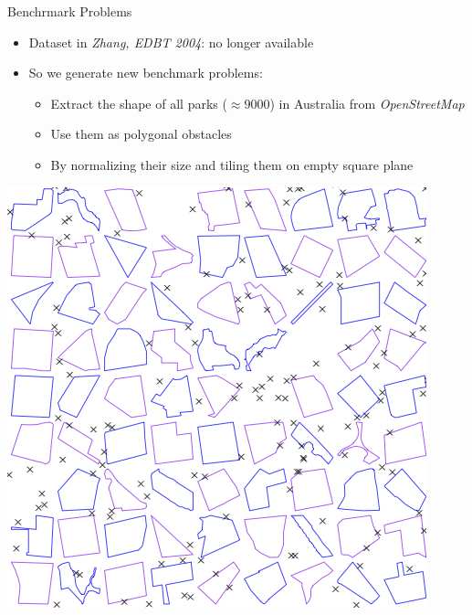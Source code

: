 \begin{frame}{Benchrmark Problems}
\begin{minipage}{.6\textwidth}
\begin{itemize}
    \item \small{Dataset in \textit{Zhang, EDBT 2004}: no longer available}
    \item \small{So we generate new benchmark problems:}
    \begin{itemize}
        \item \small{Extract the shape of all parks ($\approx 9000$) in Australia from \textit{OpenStreetMap}}
        \item \small{Use them as polygonal obstacles}
        \item \small{By normalizing their size and tiling them on empty square plane}
    \end{itemize}
\end{itemize}
\end{minipage}%
\begin{minipage}{.4\textwidth}
    \begin{adjustbox}{max totalsize={.9\textwidth}{.9\textheight}, right}
    \centering
    \includegraphics{pic/distribution.png}
    \end{adjustbox}
\end{minipage}
\end{frame}


